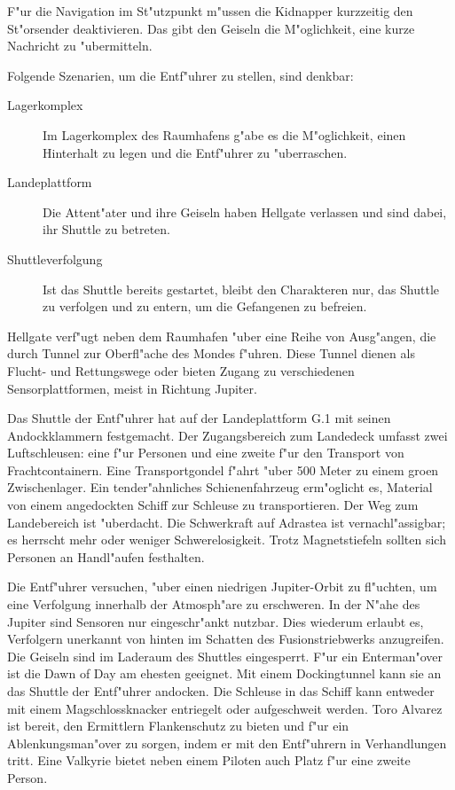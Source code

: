 F"ur die Navigation im St"utzpunkt m"ussen die Kidnapper kurzzeitig den St"orsender deaktivieren. Das gibt den Geiseln die M"oglichkeit, eine kurze Nachricht zu "ubermitteln.

Folgende Szenarien, um die Entf"uhrer zu stellen, sind denkbar:

\begin{description}
	\item [Lagerkomplex] Im Lagerkomplex des Raumhafens g"abe es die M"oglichkeit, einen Hinterhalt zu legen und die Entf"uhrer zu 
		"uberraschen. 
	\item [Landeplattform] Die Attent"ater und ihre Geiseln haben Hellgate verlassen und sind dabei, ihr Shuttle zu betreten.
	\item [Shuttleverfolgung] Ist das Shuttle bereits gestartet, bleibt den Charakteren nur, das Shuttle zu verfolgen und zu entern, um die 
		Gefangenen zu befreien.
\end{description}



Hellgate verf"ugt neben dem Raumhafen "uber eine Reihe von Ausg"angen, die durch Tunnel zur Oberfl"ache des Mondes f"uhren. Diese Tunnel dienen als Flucht- und Rettungswege oder bieten Zugang zu verschiedenen Sensorplattformen, meist in Richtung Jupiter.

Das Shuttle der Entf"uhrer hat auf der Landeplattform G.1 mit seinen Andockklammern festgemacht. Der Zugangsbereich zum Landedeck umfasst zwei Luftschleusen: eine f"ur Personen und eine zweite f"ur den Transport von Frachtcontainern. Eine Transportgondel f"ahrt "uber 500 Meter zu einem gro\3en Zwischenlager. Ein tender"ahnliches Schienenfahrzeug erm"oglicht es, Material von einem angedockten Schiff zur Schleuse zu transportieren. Der Weg zum Landebereich ist "uberdacht. Die Schwerkraft auf Adrastea ist vernachl"assigbar; es herrscht mehr oder weniger Schwerelosigkeit. Trotz Magnetstiefeln sollten sich Personen an Handl"aufen festhalten.


Die Entf"uhrer versuchen, "uber einen niedrigen Jupiter-Orbit zu fl"uchten, um eine Verfolgung innerhalb der Atmosph"are zu erschweren. In der N"ahe des Jupiter sind Sensoren nur eingeschr"ankt nutzbar. Dies wiederum erlaubt es, Verfolgern unerkannt von hinten im Schatten des Fusionstriebwerks anzugreifen. Die Geiseln sind im Laderaum des Shuttles eingesperrt. F"ur ein Enterman"over ist die Dawn of Day am ehesten geeignet. Mit einem Dockingtunnel kann sie an das Shuttle der Entf"uhrer andocken. Die Schleuse in das Schiff kann entweder mit einem Magschlossknacker entriegelt oder aufgeschwei\3t werden. Toro Alvarez ist bereit, den Ermittlern Flankenschutz zu bieten und f"ur ein Ablenkungsman"over zu sorgen, indem er mit den Entf"uhrern in Verhandlungen tritt. Eine Valkyrie bietet neben einem Piloten auch Platz f"ur eine zweite Person.

